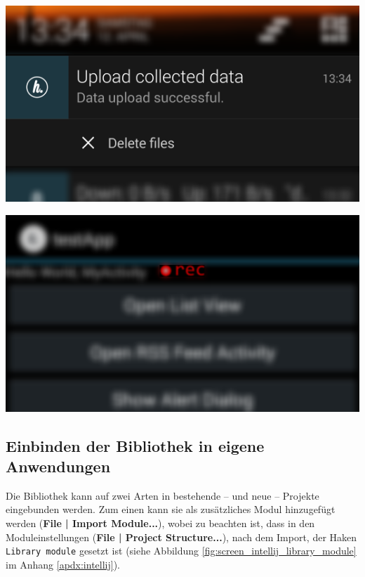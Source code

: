 \begin{minipage}[t]{0.45\linewidth}
	\centering
	\includegraphics[width=\linewidth]{img/notification_upload_finished}
	 \label{fig:notification_upload_finished}
\end{minipage}
\hfill
\begin{minipage}[t]{0.45\linewidth}
	\centering
	\includegraphics[width=\linewidth]{img/record_on_top_icon}
	 \label{fig:icon_record_on_top}
\end{minipage}

\subsection{Einbinden der Bibliothek in eigene Anwendungen}
Die Bibliothek kann auf zwei Arten in bestehende -- und neue -- Projekte eingebunden werden.
Zum einen kann sie als zusätzliches Modul hinzugefügt werden (\textbf{File | Import Module...}), wobei zu beachten ist, dass in den Moduleinstellungen (\textbf{File | Project Structure...}), nach dem Import, der Haken \texttt{Library module} gesetzt ist (siehe Abbildung \ref{fig:screen_intellij_library_module} im Anhang \ref{apdx:intellij}).


